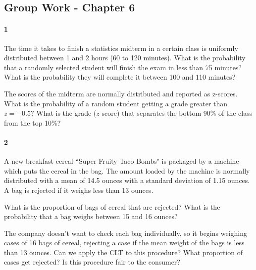 \documentclass{article}
\begin{document}
\begin{flushleft}
\section*{Group Work - Chapter 6}
\paragraph{1}
\begin{enumalpha}
\item The time it takes to finish a statistics midterm in a certain class is uniformly distributed between 1 and 2 hours (60 to 120 minutes). What is the probability that a randomly selected student will finish the exam in less than 75 minutes? What is the probability they will complete it between 100 and 110 minutes?
\vspace{3.25in}
\item The scores of the midterm are normally distributed and reported as z-scores. What is the probability of a random student getting a grade greater than $z = -0.5$? What is the grade ($z$-score) that separates the bottom 90\% of the class from the top 10\%?
\end{enumalpha}



\newpage
\paragraph{2} A new breakfast cereal ``Super Fruity Taco Bombs" is packaged by a machine which puts the cereal in the bag. The amount loaded by the machine is normally distributed with a mean of 14.5 ounces with a standard deviation of 1.15 ounces. A bag is rejected if it weighs less than 13 ounces.
\begin{enumalpha}
\item What is the proportion of bags of cereal that are rejected? What is the probability that a bag weighs between 15 and 16 ounces?
\vspace{3.25in}
\item The company doesn't want to check each bag individually, so it begins weighing cases of 16 bags of cereal, rejecting a case if the mean weight of the bags is less than 13 ounces. Can we apply the CLT to this procedure? What proportion of cases get rejected? Is this procedure fair to the consumer?
\end{enumalpha}

\newpage

\end{flushleft}
\end{document}
